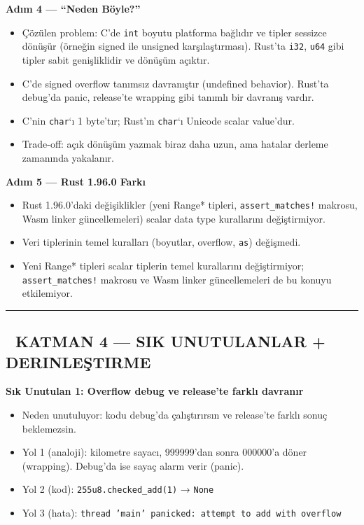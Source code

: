 \documentclass[12pt,a4paper]{article}
\begin{document}
\textbf{Adım 4 --- ``Neden Böyle?''}

\begin{itemize}
\tightlist
\item
  Çözülen problem: C'de \texttt{int} boyutu platforma bağlıdır ve tipler sessizce dönüşür (örneğin signed ile unsigned karşılaştırması). Rust'ta \texttt{i32}, \texttt{u64} gibi tipler sabit genişliklidir ve dönüşüm açıktır.
\item
  C'de signed overflow tanımsız davranıştır (undefined behavior). Rust'ta debug'da panic, release'te wrapping gibi tanımlı bir davranış vardır.
\item
  C'nin \texttt{char}`ı 1 byte'tır; Rust'ın \texttt{char}`ı Unicode scalar value'dur.
\item
  Trade-off: açık dönüşüm yazmak biraz daha uzun, ama hatalar derleme zamanında yakalanır.
\end{itemize}

\textbf{Adım 5 --- Rust 1.96.0 Farkı}

\begin{itemize}
\tightlist
\item
  Rust 1.96.0'daki değişiklikler (yeni Range* tipleri, \texttt{assert\_matches!} makrosu, Wasm linker güncellemeleri) scalar data type kurallarını değiştirmiyor.
\item
  Veri tiplerinin temel kuralları (boyutlar, overflow, \texttt{as}) değişmedi.
\item
  Yeni Range* tipleri scalar tiplerin temel kurallarını değiştirmiyor; \texttt{assert\_matches!} makrosu ve Wasm linker güncellemeleri de bu konuyu etkilemiyor.
\end{itemize}

\begin{center}\rule{0.5\linewidth}{0.5pt}\end{center}

\subsection{🔴 KATMAN 4 --- SIK UNUTULANLAR + DERINLEŞTIRME}\label{katman-4-—-sik-unutulanlar-derinleştirme-3}

\textbf{Sık Unutulan 1: Overflow debug ve release'te farklı davranır}

\begin{itemize}
\tightlist
\item
  Neden unutuluyor: kodu debug'da çalıştırırsın ve release'te farklı sonuç beklemezsin.
\item
  Yol 1 (analoji): kilometre sayacı, 999999'dan sonra 000000'a döner (wrapping). Debug'da ise sayaç alarm verir (panic).
\item
  Yol 2 (kod): \texttt{255u8.checked\_add(1)} → \texttt{None}
\item
  Yol 3 (hata): \texttt{thread\ 'main'\ panicked:\ attempt\ to\ add\ with\ overflow}
\end{itemize}
\end{document}
